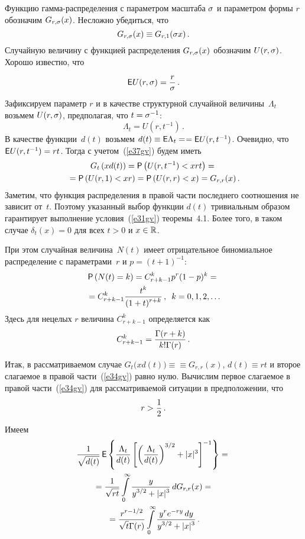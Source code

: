 \begin{multicols}{2}
Функцию гамма-распределения с параметром масштаба $\sigma$ и
параметром формы $r$ обозначим $G_{r,\sigma}(x)$. Несложно убедиться,
что
\begin{equation}
G_{r,\sigma}(x)\equiv G_{r,1}(\sigma x)\,.\label{e37gv}
\end{equation}
Случайную величину с функцией распределения $G_{r,\sigma}(x)$
обозначим $U(r,\sigma)$. Хорошо известно, что
$$
{\sf E}U(r,\sigma)=\displaystyle\frac{\displaystyle r\mathstrut}{\displaystyle \sigma\mathstrut}\,.
$$
Зафиксируем параметр $r$ и в качестве структурной случайной
величины~$\Lambda_t$ возьмем $U(r,\sigma)$, предполагая, что
$t=\sigma^{-1}$:
$$
\Lambda_t=U(r,t^{-1})\,.
$$
В качестве функции~$d(t)$ возьмем $d(t)\equiv{\sf E}\Lambda_t=$\linebreak $={\sf
E}U(r,t^{-1})$. Очевидно, что ${\sf E}U(r,t^{-1})=rt$. Тогда с
учетом~(\ref{e37gv}) будем иметь
\begin{multline*}
G_t\left(xd(t)\right)={\sf P}\left(U(r,t^{-1})<xrt\right)={}\\
{}={\sf P}\left(U(r,1)<xr\right)={\sf P}\left(U(r,r)<x\right)=G_{r,r}(x)\,.
\end{multline*}
Заметим, что функция распределения в правой час\-ти последнего
соотношения не зависит от~$t$. Поэтому указанный выбор функции
$d(t)$ тривиальным образом гарантирует выполнение условия~(\ref{e31gv})
теоремы~4.1. Более того, в таком случае $\delta_t(x)=0$ для всех
$t>0$ и $x\in\mathbb R$.

При этом случайная величина~$N(t)$ имеет отрицательное
биномиальное распределение с па\-ра\-мет\-ра\-ми~$r$ и $p=(t+1)^{-1}$:
\begin{multline}
{\sf P}\left(N(t)=k\right)=C_{r+k-1}^{k}p^r(1-p)^k
={}\\
{}=C_{r+k-1}^{k}\displaystyle\frac{\displaystyle t^k\mathstrut}{\displaystyle (1+t)^{r+k}\mathstrut}\,,\enskip k=0,1,2,\ldots
\label{e38gv}
\end{multline}
Здесь для нецелых $r$ величина $C_{r+k-1}^{k}$ определяется как
$$
C_{r+k-1}^{k} = \displaystyle\frac{\displaystyle \Gamma(r+k)\mathstrut}{\displaystyle k!\Gamma(r)\mathstrut}\,.
$$

Итак, в рассматриваемом случае $G_t\big(xd(t)\big)\equiv$\linebreak $\equiv
G_{r,r}(x)$, $d(t)\equiv rt$ и второе слагаемое в правой час\-ти~(\ref{e34gv}) 
равно нулю. Вычислим первое слагаемое в правой части~(\ref{e34gv}) для
рассматриваемой ситуации в предположении, что
\begin{equation}
r>\displaystyle\frac{\displaystyle 1\mathstrut}{\displaystyle 2\mathstrut}\,.\label{e39gv}
\end{equation}
Имеем
\begin{multline}
\displaystyle\frac{\displaystyle 1\mathstrut}{\displaystyle \sqrt{d(t)}\mathstrut}\,{\sf
E}\left\{\displaystyle\frac{\displaystyle \Lambda_t\mathstrut}{\displaystyle d(t)\mathstrut}\left[\left(\displaystyle\frac{\displaystyle \Lambda_t\mathstrut}{\displaystyle d(t)\mathstrut}\right)^{3/2}+|x|^3\right]^{-1}\right\}={}\\
{}=
\displaystyle\frac{\displaystyle 1\mathstrut}{\displaystyle \sqrt{rt}\mathstrut}\int\limits_0^{\infty}\displaystyle\frac{\displaystyle y\mathstrut}{\displaystyle y^{3/2}+|x|^3\mathstrut}\,dG_{r,r}(x)={}\\
{}=
\displaystyle\frac{\displaystyle r^{r-1/2}\mathstrut}{\displaystyle \sqrt{t}\Gamma(r)\mathstrut}\int\limits_0^{\infty}\displaystyle\frac{\displaystyle y^re^{-ry}\,dy\mathstrut}{\displaystyle y^{3/2}+|x|^3\mathstrut}\,.
\label{e40gv}
\end{multline}


\end{multicols}
